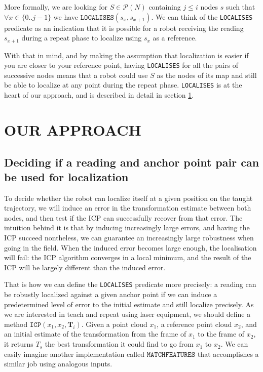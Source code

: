 \documentclass[letterpaper,10 pt,conference]{ieeeconf}
\newcommand{\mat}[1]{\mathbf{#1}}
\begin{document}
More formally, we are looking for $S \in \mathcal{P}(N)$ containing $j \leq i$
nodes $s$ such that $\forall x \in \{ 0..j-1 \}$ we have
$\texttt{LOCALISES}(s_x, s_{x+1})$. We can think of the \texttt{LOCALISES}
predicate as an indication that it is possible for a robot receiving the reading
$s_{x+1}$ during a repeat phase to localize using $s_{x}$ as a reference. 

With that in mind, and by making the assumption that localization is easier if you
are closer to your reference point, having \texttt{LOCALISES} for all the pairs
of successive nodes means that a robot could use $S$ as the nodes of its map and
still be able to localize at any point during the repeat phase.
\texttt{LOCALISES} is at the heart of our approach, and is described in detail in
section \ref{approach}.
\section{OUR APPROACH}
\label{approach}

\subsection{Deciding if a reading and anchor point pair can be used for localization}
\label{approach-deciding-converge}


To decide whether the robot can localize itself at a given position on the
taught trajectory, we will induce an error in the transformation estimate
between both nodes, and then test if the ICP can successfully recover from that
error. 
The intuition behind it is that by inducing increasingly
large errors, and having the ICP succeed nontheless, we can guarantee an
increasingly large robustness when going in the field. When the induced error
becomes large enough, the localisation will fail: the ICP algorithm converges in
a local minimum, and the result of the ICP will be largely different than the
induced error.

That is how we can define the \texttt{LOCALISES} predicate more precisely: a
reading can be robustly localized against a given anchor point if we can induce
a predetermined level of error to the initial estimate and still localize
precisely.
As we are interested in teach and repeat using laser equipment, we should define
a method $\texttt{ICP}(x_1, x_2, \mat{T}_i)$. 
Given a point cloud $x_1$, a
reference point cloud $x_2$, and an initial estimate of the transformation from
the frame of $x_1$ to the frame of $x_2$, it returns $T_s$ the best transformation
it could find to go from $x_1$ to $x_2$. 
We can easily imagine another implementation called $\texttt{MATCHFEATURES}$
that accomplishes a similar job using analogous inputs.
\end{document}

